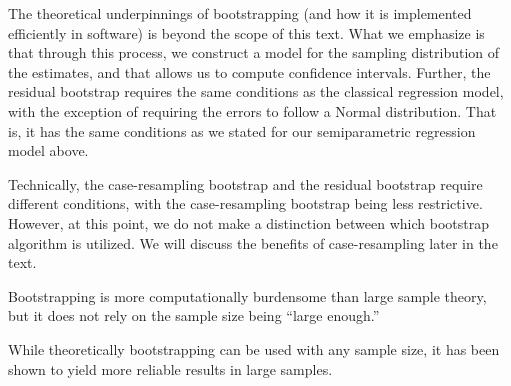 \documentclass[
  letterpaper,
  DIV=11,
  numbers=noendperiod]{scrreprt}
\theoremstyle{definition}
\theoremstyle{definition}
\theoremstyle{remark}
\begin{document}
The theoretical underpinnings of bootstrapping (and how it is
implemented efficiently in software) is beyond the scope of this text.
What we emphasize is that through this process, we construct a model for
the sampling distribution of the estimates, and that allows us to
compute confidence intervals. Further, the residual bootstrap requires
the same conditions as the classical regression model, with the
exception of requiring the errors to follow a Normal distribution. That
is, it has the same conditions as we stated for our semiparametric
regression model above.

\begin{tcolorbox}[enhanced jigsaw, left=2mm, toprule=.15mm, arc=.35mm, breakable, opacitybacktitle=0.6, opacityback=0, rightrule=.15mm, colbacktitle=quarto-callout-note-color!10!white, coltitle=black, leftrule=.75mm, toptitle=1mm, colframe=quarto-callout-note-color-frame, titlerule=0mm, title=\textcolor{quarto-callout-note-color}{\faInfo}\hspace{0.5em}{Note}, bottomrule=.15mm, colback=white, bottomtitle=1mm]

Technically, the case-resampling bootstrap and the residual bootstrap
require different conditions, with the case-resampling bootstrap being
less restrictive. However, at this point, we do not make a distinction
between which bootstrap algorithm is utilized. We will discuss the
benefits of case-resampling later in the text.

\end{tcolorbox}

Bootstrapping is more computationally burdensome than large sample
theory, but it does not rely on the sample size being ``large enough.''

\begin{tcolorbox}[enhanced jigsaw, left=2mm, toprule=.15mm, arc=.35mm, breakable, opacitybacktitle=0.6, opacityback=0, rightrule=.15mm, colbacktitle=quarto-callout-note-color!10!white, coltitle=black, leftrule=.75mm, toptitle=1mm, colframe=quarto-callout-note-color-frame, titlerule=0mm, title=\textcolor{quarto-callout-note-color}{\faInfo}\hspace{0.5em}{Note}, bottomrule=.15mm, colback=white, bottomtitle=1mm]

While theoretically bootstrapping can be used with any sample size, it
has been shown to yield more reliable results in large samples.

\end{tcolorbox}
\end{document}
